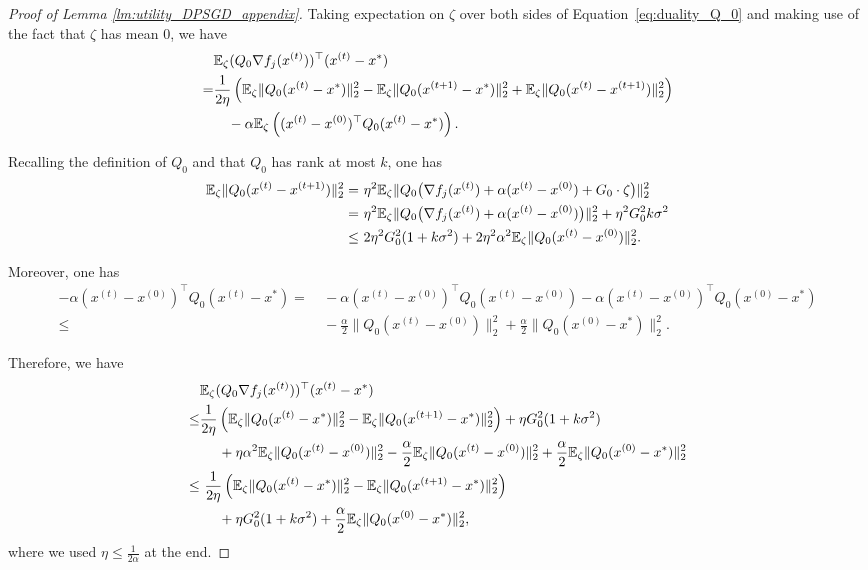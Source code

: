 \begin{proof}[Proof of Lemma \ref{lm:utility_DPSGD_appendix}]
Taking expectation on $\zeta$ over both sides of Equation~\eqref{eq:duality_Q_0} and making use of the fact that $\zeta$ has mean $0$, we have
\begin{align*}
 &\mathbb{E}_{\zeta}(Q_{0}\nabla f_{j}(x^{(t)}))^{\top}(x^{(t)}-x^{*}) \\
=& \frac{1}{2\eta}
    \left(\mathbb{E}_{\zeta}\|Q_{0}(x^{(t)}-x^{*})\|_2^{2} - 
        \mathbb{E}_{\zeta}\|Q_{0}(x^{(t+1)}-x^{*})\|_2^{2} + 
        \mathbb{E}_{\zeta}\|Q_{0}(x^{(t)}-x^{(t+1)})\|_2^{2}\right)\\
 & \quad -\alpha\mathbb{E}_{\zeta}\left( (x^{(t)}-x^{(0)})^{\top}Q_{0}(x^{(t)}-x^{*}) \right).
\end{align*}

Recalling the definition of $Q_0$ and that $Q_0$ has rank at most $k$, one has
\begin{align*}
\mathbb{E}_{\zeta}\|Q_{0}(x^{(t)}-x^{(t+1)})\|_2^{2} =
    &~ \eta^{2}\mathbb{E}_{\zeta}\|Q_{0}\big(\nabla f_{j}(x^{(t)})+\alpha(x^{(t)}-x^{(0)})+G_{0}\cdot\zeta\big)\|_2^{2}\\
    = &~ \eta^{2}\mathbb{E}_{\zeta}\|Q_{0}\big(\nabla f_{j}(x^{(t)})+\alpha(x^{(t)}-x^{(0)})\big)\|_2^{2}+\eta^{2}G_{0}^{2}k\sigma^{2}\\
\leq &~
    2\eta^{2}G_{0}^{2}(1+k\sigma^{2}) + 
    2\eta^{2}\alpha^{2}\mathbb{E}_{\zeta}\|Q_{0}(x^{(t)}-x^{(0)})\|_2^{2}.
\end{align*}

Moreover, one has
\begin{align*}
-\alpha(x^{(t)}-x^{(0)})^{\top}Q_{0}(x^{(t)}-x^{*}) = &~ -\alpha(x^{(t)}-x^{(0)})^{\top}Q_{0}(x^{(t)}-x^{(0)})-\alpha(x^{(t)}-x^{(0)})^{\top}Q_{0}(x^{(0)}-x^{*})\\
\leq &~
    -\frac{\alpha}{2}\|Q_{0}(x^{(t)}-x^{(0)})\|_2^{2} + 
    \frac{\alpha}{2}\|Q_{0}(x^{(0)}-x^{*})\|_2^{2}.
\end{align*}

Therefore, we have
\begin{align}
& \mathbb{E}_{\zeta}(Q_{0}\nabla f_{j}(x^{(t)}))^{\top}(x^{(t)}-x^{*}) \\
\leq& \frac{1}{2\eta}
        \left(\mathbb{E}_{\zeta}\|Q_{0}(x^{(t)}-x^{*})\|_2^{2} - 
           \mathbb{E}_{\zeta}\|Q_{0}(x^{(t+1)}-x^{*})\|_2^{2}
        \right) + \eta G_0^2(1+k\sigma^2) \nonumber\\ 
     &~~~~ +\eta \alpha^2\mathbb{E}_{\zeta}\| Q_0(x^{(t)}-x^{(0)})\|_2^2 - 
                \frac{\alpha}{2}\mathbb{E}_{\zeta}\|Q_{0}(x^{(t)}-x^{(0)})\|_2^{2} + 
                \frac{\alpha}{2}\mathbb{E}_{\zeta}\|Q_{0}(x^{(0)}-x^{*})\|_2^{2}  \nonumber \\
     \leq & ~ \frac{1}{2\eta} \left(\mathbb{E}_{\zeta}\|Q_{0}(x^{(t)}-x^{*})\|_2^{2} - 
                \mathbb{E}_{\zeta}\|Q_{0}(x^{(t+1)}-x^{*})\|_2^{2}  \right)  \\
                &~~~~+\eta G_0^2(1+k\sigma^2)+\frac{\alpha}{2}\mathbb{E}_{\zeta}\|Q_0(x^{(0)}-x^*)\|_2^2 \label{eq:term1},
\end{align}
where we used $\eta\leq\frac{1}{2\alpha}$ at the end. 
\medskip


\end{proof}

